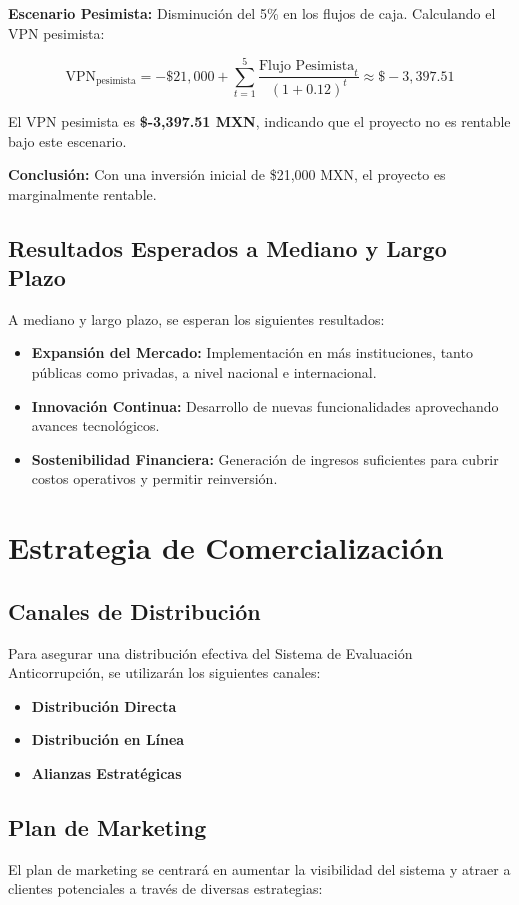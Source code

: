 \documentclass[a4paper,12pt]{article}
\begin{document}
\textbf{Escenario Pesimista:} Disminución del 5\% en los flujos de caja. Calculando el VPN pesimista:

\[
\text{VPN}_{\text{pesimista}} = -\$21,000 + \sum_{t=1}^{5} \frac{\text{Flujo Pesimista}_t}{(1 + 0.12)^t} \approx \$-3,397.51
\]

El VPN pesimista es \textbf{\$-3,397.51 MXN}, indicando que el proyecto no es rentable bajo este escenario.

\textbf{Conclusión:} Con una inversión inicial de \$21,000 MXN, el proyecto es marginalmente rentable.


\subsection{Resultados Esperados a Mediano y Largo Plazo}
A mediano y largo plazo, se esperan los siguientes resultados:

\begin{itemize}
    \item \textbf{Expansión del Mercado:} Implementación en más instituciones, tanto públicas como privadas, a nivel nacional e internacional.
    \item \textbf{Innovación Continua:} Desarrollo de nuevas funcionalidades aprovechando avances tecnológicos.
    \item \textbf{Sostenibilidad Financiera:} Generación de ingresos suficientes para cubrir costos operativos y permitir reinversión.
\end{itemize}

\section{Estrategia de Comercialización}
\subsection{Canales de Distribución}
Para asegurar una distribución efectiva del Sistema de Evaluación Anticorrupción, se utilizarán los siguientes canales:

\begin{itemize}
    \item \textbf{Distribución Directa} 
    \item \textbf{Distribución en Línea}
    \item \textbf{Alianzas Estratégicas}
\end{itemize}

\subsection{Plan de Marketing}
El plan de marketing se centrará en aumentar la visibilidad del sistema y atraer a clientes potenciales a través de diversas estrategias:
\end{document}
